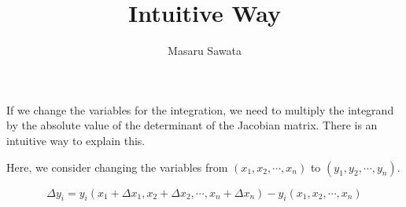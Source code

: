 \documentclass[letterpaper, 12pt]{article}
\title{Intuitive Way}
\author{Masaru Sawata}
\theoremstyle{custom}
\begin{document}
\maketitle
If we change the variables for the integration, we need to multiply the integrand by the absolute value of the determinant of the Jacobian matrix.
There is an intuitive way to explain this.

Here, we consider changing the variables from $(x_1, x_2, \cdots , x_n)$ to $(y_1, y_2, \cdots , y_n)$.

\begin{equation*}
  \Delta y_i = y_i (x_1 + \Delta x_1, x_2+ \Delta x_2, \cdots , x_n+ \Delta x_n) - y_i (x_1, x_2, \cdots , x_n)
\end{equation*}
\end{document}
